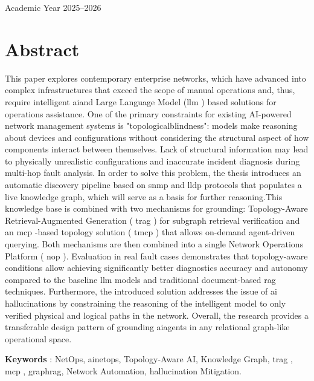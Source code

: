 \documentclass[11pt,a4paper]{report}
\begin{document}
\begin{titlepage}
\begin{center}
\vfill

{\large Academic Year 2025--2026}

\end{center}
\end{titlepage}

\chapter*{Abstract}
This paper explores contemporary enterprise networks, which have advanced into complex infrastructures that exceed the scope of manual operations and, thus, require intelligent \gls{ai}and Large Language Model (\gls{llm} ) based solutions for operations assistance. One of the primary constraints for existing AI-powered network management systems is "\gls{topologicalblindness}": models make reasoning about devices and configurations without considering the structural aspect of how components interact between themselves. Lack of structural information may lead to physically unrealistic configurations and inaccurate incident diagnosis during multi-hop fault analysis. In order to solve this problem, the thesis introduces an automatic discovery pipeline based on \gls{snmp} and \gls{lldp}  protocols that populates a live knowledge graph, which will serve as a basis for further reasoning.This knowledge base is combined with two mechanisms for \gls{grounding}: Topology-Aware Retrieval-Augmented Generation ( \gls{trag} ) for subgraph retrieval verification and an \gls{mcp} -based topology solution ( \gls{tmcp} ) that allows on-demand agent-driven querying. Both mechanisms are then combined into a single Network Operations Platform ( \gls{nop} ). Evaluation in real fault cases demonstrates that topology-aware conditions allow achieving significantly better diagnostics accuracy and autonomy compared to the baseline \gls{llm}  models and traditional document-based  \gls{rag}  techniques. Furthermore, the introduced solution addresses the issue of \gls{ai} \gls{hallucination}s by constraining the reasoning of the intelligent model to only verified physical and logical paths in the network. Overall, the research provides a transferable design pattern of \gls{grounding} \gls{ai}agents in any relational graph-like operational space.

\textbf{Keywords} : NetOps, \gls{ainetops}, Topology-Aware AI, Knowledge Graph,  \gls{trag} , \gls{mcp} , \gls{graphrag}, Network Automation, \gls{hallucination} Mitigation.
\end{document}
